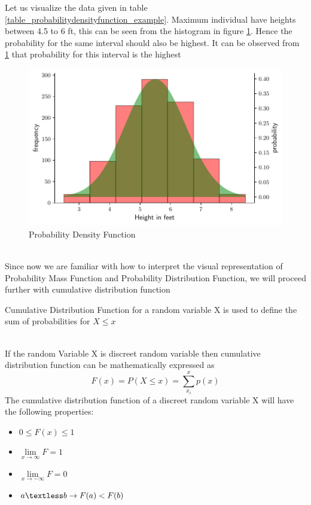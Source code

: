 \documentclass[twoside,12pt]{report}  %
\begin{document}
\begin{tcolorbox}[colback=blue!5!white, colframe=blue!75!black, title = \textbf{Visualizing Probability Density Function}]
Let us visualize the data given in table \ref{table_probabilitydensityfunction_example}. Maximum individual have heights between 4.5 to 6 ft, this can be seen from the histogram in figure \ref{figure_probabilitydensityfunction_example}. Hence the probability for the same interval should also be highest. It can be observed from \ref{figure_probabilitydensityfunction_example} that probability for this interval is the highest 
	\begin{figure}[H]
		\centering
		\includegraphics[width=0.5\linewidth]{./images/figure_probabilitydensityfunction_example.pdf}
		\caption{Probability Density Function}
		\label{figure_probabilitydensityfunction_example}
	\end{figure}

\end{tcolorbox}
\noindent
\\
Since now we are familiar with how to interpret the visual representation of Probability Mass Function and Probability Distribution Function, we will proceed further with cumulative distribution function
\\
\begin{tcolorbox}[colback=red!5!white, colframe=red!75!black, title = \textbf{Cumulative Distribution Function}]
	Cumulative Distribution Function for a random variable X is used to define the sum of probabilities for $ X \le x$ 
\end{tcolorbox}
\noindent
\\
If the random Variable X is discreet random variable then cumulative distribution function can be mathematically expressed as
$$ F(x) = P(X \le x) = \sum_{x_i}^{x} p(x) $$
\noindent
The cumulative distribution function of a discreet random variable X will have the following properties:
\begin{itemize}
	\item $ 0 \le F(x) \le 1 $
	\item $ \lim\limits_{x \rightarrow \infty} F = 1 $
	\item $ \lim\limits_{x \rightarrow -\infty} F = 0 $
	\item $a \textless b \rightarrow F(a) < F(b)$
\end{itemize}
\end{document}
